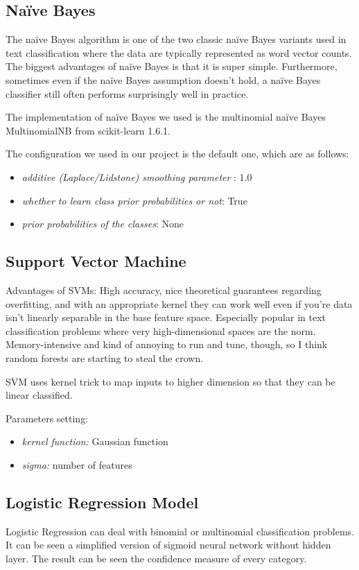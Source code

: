 \documentclass[letterpaper,11pt,twocolumn]{article}
\begin{document}
\subsection{Na{\"i}ve Bayes}
The na{\"i}ve Bayes algorithm is one of the two classic na{\"i}ve Bayes variants used in text classification where the data are typically represented as word vector counts. The biggest advantages of na{\"i}ve Bayes is that it is super simple. Furthermore, sometimes even if the na{\"i}ve Bayes assumption doesn't hold, a na{\"i}ve Bayes classifier still often performs surprisingly well in practice.

The implementation of na{\"i}ve Bayes we used is the multinomial na{\"i}ve Bayes MultinomialNB from scikit-learn 1.6.1.

The configuration we used in our project is the default one, which are as follows:
\begin{itemize}
\item \emph{additive (Laplace/Lidstone) smoothing parameter }: 1.0
\item \emph{whether to learn class prior probabilities or not}: True
\item \emph{prior probabilities of the classes}: None
\end{itemize}

\subsection{Support Vector Machine}
Advantages of SVMs: High accuracy, nice theoretical guarantees regarding overfitting, and with an appropriate kernel they can work well even if you're data isn't linearly separable in the base feature space. Especially popular in text classification problems where very high-dimensional spaces are the norm. Memory-intensive and kind of annoying to run and tune, though, so I think random forests are starting to steal the crown.

SVM uses kernel trick to map inputs to higher dimension so that they can be linear classified.

Parameters setting:
\begin{itemize} 
\item \emph{kernel function:} Gaussian function
\item \emph{sigma:} number of features
\end{itemize}

\subsection{Logistic Regression Model}
Logistic Regression can deal with binomial or multinomial classification problems. It can be seen a simplified version of sigmoid neural network without hidden layer. The result can be seen the confidence measure of every category.
\end{document}
